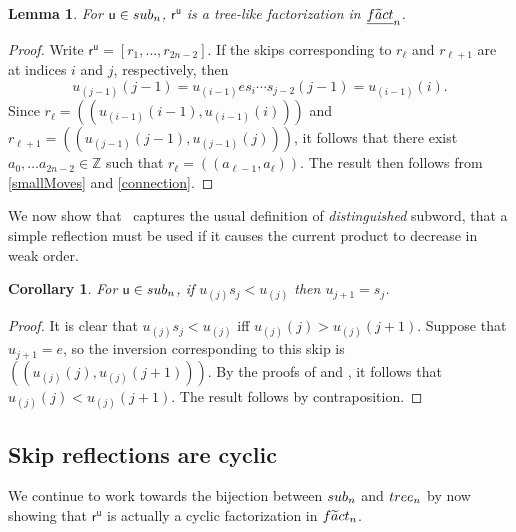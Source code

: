 \documentclass[a4paper,10pt,leqno]{amsart}
\numberwithin{equation}{section}
\newtheorem{corollary}[theorem]{Corollary}
\newtheorem{lemma}[theorem]{Lemma}
\theoremstyle{definition}
\theoremstyle{remark}
\renewcommand{\u}{\mathsf{u}}
\newcommand{\T}{\textsc{tree}}
\newcommand{\Ft}{\textsc{f}\widetilde{\textsc{a}}\textsc{ct}}
\renewcommand{\S}{\textsc{sub}}
\newcommand{\E}{\T}
\newcommand{\Fact}{\textsc{fact}}
\newcommand{\EFt}{\underline{\Ft}}
\newcommand{\rr}{\mathsf{r}}
\newcommand{\rru}{\rr^\u}
\begin{document}
\begin{lemma}
\label{lem:subCond1}
    For $\u \in \S_n$, $\rru$ is a tree-like factorization in $\EFt_n$.%
\end{lemma}
\begin{proof} Write $\rru = \left[r_1,\dots,r_{2n-2}\right]$. If the skips corresponding to $r_\ell$ and $r_{\ell + 1}$ are at indices $i$ and $j$, respectively, then
    \[
        u_{(j-1)}(j-1) = u_{(i-1)} e s_{i}\cdots s_{j-2}(j-1) = u_{(i-1)}(i).
    \]
    Since $r_\ell = (\!(u_{(i-1)}(i-1), u_{(i-1)}(i) )\!)$ and $r_{\ell + 1} = (\!(u_{(j-1)}(j-1), u_{(j-1)}(j) )\!)$, it follows that there exist $a_0,\dots a_{2n-2} \in \mathbb{Z}$ such that $r_\ell = (\!(a_{\ell - 1} , a_\ell)\!)$.     The result then follows from \cref{smallMoves} and \cref{connection}.
\end{proof}

We now show that~ captures the usual definition of \emph{distinguished} subword, that a simple reflection must be used if it causes the current product to decrease in weak order.

\begin{corollary}
\label{cor:distinguished}
  For $\u \in \S_n$, if $u_{(j)}s_j < u_{(j)}$ then $u_{j+1} = s_j$.
\end{corollary}
\begin{proof}
It is clear that $u_{(j)}s_j < u_{(j)}$ iff $u_{(j)}(j) > u_{(j)}(j+1)$.  Suppose that $u_{j+1} = e$, so the inversion corresponding to this skip is $(\!(u_{(j)}(j), u_{(j)}(j+1) )\!)$. By the proofs of  and , it follows that $u_{(j)}(j) < u_{(j)}(j+1)$.  The result follows by contraposition.
\end{proof}


\subsection{Skip reflections are cyclic}
We continue to work towards the bijection between $\S_n$ and $\E_n$ by now showing that $\rru$ is actually a cyclic factorization in $\Ft_n$.
\end{document}
